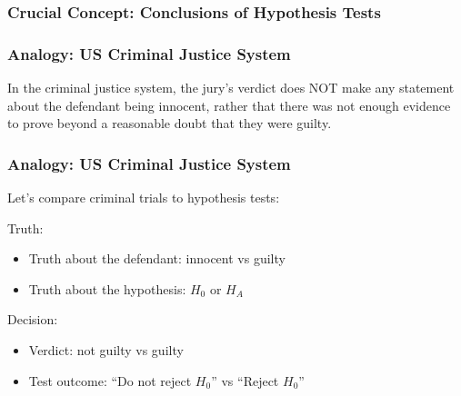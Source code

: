 \documentclass[handout]{beamer}
\newcommand{\blue}[1]{\textcolor{blue2}{#1}}
\begin{document}
\begin{frame}
\frametitle{Crucial Concept: Conclusions of Hypothesis Tests}

%
%

\end{frame}


\begin{frame}
\frametitle{Analogy:  US Criminal Justice System}

In the criminal justice system, the jury's verdict does NOT make any statement about the defendant being \blue{innocent}, rather that there was not enough evidence to prove beyond a reasonable doubt that they were guilty.

\end{frame}


\begin{frame}
\frametitle{Analogy:  US Criminal Justice System}

Let's compare criminal trials to hypothesis tests:

\vspace{0.5cm}

\pause \blue{Truth}:
\begin{itemize}
\item Truth about the defendant: innocent vs guilty
\item Truth about the hypothesis: $H_0$ or $H_A$
\end{itemize}

\vspace{0.25cm}

\pause \blue{Decision}:
\begin{itemize}
\item Verdict:  not guilty vs guilty
\item Test outcome: ``Do not reject $H_0$'' vs ``Reject $H_0$''
\end{itemize}

\end{frame}
\end{document}
